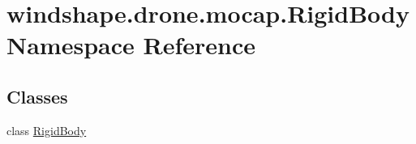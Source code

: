 \hypertarget{namespacewindshape_1_1drone_1_1mocap_1_1_rigid_body}{}\section{windshape.\+drone.\+mocap.\+Rigid\+Body Namespace Reference}
\label{namespacewindshape_1_1drone_1_1mocap_1_1_rigid_body}
\subsection*{Classes}
\begin{DoxyCompactItemize}
\item 
class \mbox{\hyperlink{classwindshape_1_1drone_1_1mocap_1_1_rigid_body_1_1_rigid_body}{Rigid\+Body}}
\end{DoxyCompactItemize}
